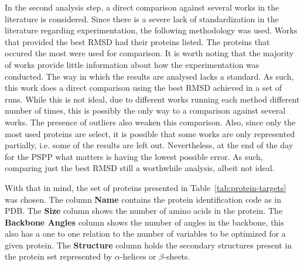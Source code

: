 In the second analysis step, a direct comparison against several works in the
literature is considered. Since there is a severe lack of standardization in the
literature regarding experimentation, the following methodology was used. Works
that provided the best RMSD had their proteins listed. The proteins that occured
the most were used for comparison. It is worth noting that the majority of works
provide little information about how the experimentation was conducted. The way
in which the results are analysed lacks a standard. As such, this work does a
direct comparison using the best RMSD achieved in a set of runs. While this is
not ideal, due to different works running each method different number of times,
this is possibly the only way to a comparison against several works. The presence
of outliers also weaken this comparison. Also, since only the most used proteins
are select, it is possible that some works are only represented partially, i.e.
some of the results are left out. Nevertheless, at the end of the day for the
PSPP what matters is having the lowest possible error. As such, comparing just
the best RMSD still a worthwhile analysis, albeit not ideal.

With that in mind, the set of proteins presented in Table~\ref{tab:protein-targets}
was chosen. The column \textbf{Name} contains the protein identification code
as in PDB.  The \textbf{Size} column shows the number of amino acids in the protein.
The \textbf{Backbone Angles} column shows the number of angles in the backbone,
this also has a one to one relation to the number of variables to be optimized
for a given protein. The \textbf{Structure} column holds the secondary
structures present in the protein set represented by $\alpha$-helices or
$\beta$-sheets.

